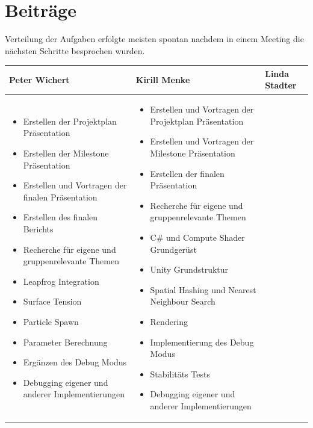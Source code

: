 \documentclass[a4paper]{paper}
\begin{document}
\section{Beiträge}
Verteilung der Aufgaben erfolgte meisten spontan nachdem in einem Meeting die nächsten Schritte besprochen wurden.
\begin{center}
\begin{tabularx}{\textwidth}{ 
		| >{\raggedright\arraybackslash}X 
		| >{\raggedright\arraybackslash}X 
		| >{\raggedright\arraybackslash}X | }
\hline
Peter Wichert & Kirill Menke & Linda Stadter\\
\hline \hline
\begin{itemize}
\item Erstellen der Projektplan Präsentation
\item Erstellen der Milestone Präsentation
\item Erstellen und Vortragen der finalen Präsentation
\item Erstellen des finalen Berichts
\item Recherche für eigene und gruppenrelevante Themen
\item Leapfrog Integration
\item Surface Tension
\item Particle Spawn
\item Parameter Berechnung
\item Ergänzen des Debug Modus
\item Debugging eigener und anderer Implementierungen
\end{itemize}
&
\begin{itemize}
\item Erstellen und Vortragen der Projektplan Präsentation
\item Erstellen und Vortragen der Milestone Präsentation
\item Erstellen der finalen Präsentation
\item Recherche für eigene und gruppenrelevante Themen
\item C\# und Compute Shader Grundgerüst
\item Unity Grundstruktur
\item Spatial Hashing und Nearest Neighbour Search
\item Rendering
\item Implementierung des Debug Modus
\item Stabilitäts Tests
\item Debugging eigener und anderer Implementierungen
\end{itemize}

\end{tabularx}
\end{center}
\end{document}
